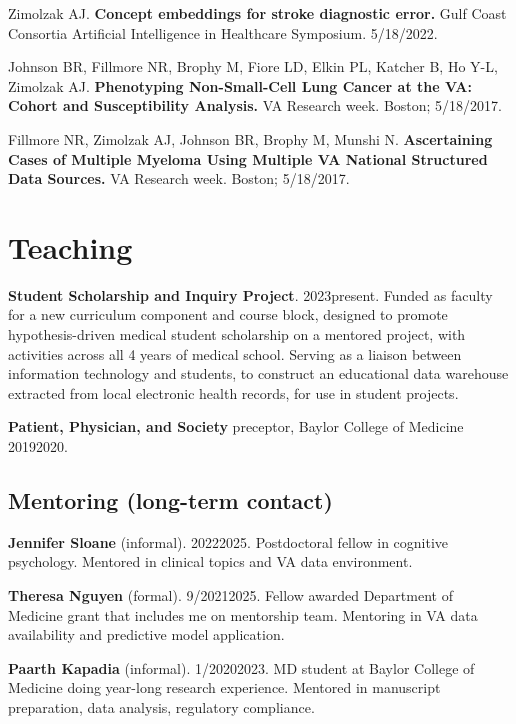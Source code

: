 \documentclass[10pt]{article}
\begin{document}
Zimolzak AJ. \textbf{Concept embeddings for stroke diagnostic error.}
Gulf Coast Consortia Artificial Intelligence in Healthcare Symposium.
5/18/2022.

Johnson BR, Fillmore NR, Brophy M, Fiore LD, Elkin PL, Katcher B, Ho
Y-L, Zimolzak AJ. \textbf{Phenotyping Non-Small-Cell Lung Cancer at
  the VA: Cohort and Susceptibility Analysis.} VA Research week.
Boston; 5/18/2017.

Fillmore NR, Zimolzak AJ, Johnson BR, Brophy M, Munshi N.
\textbf{Ascertaining Cases of Multiple Myeloma Using Multiple VA
  National Structured Data Sources.} VA Research week. Boston;
5/18/2017.



\section{Teaching}

\textbf{Student Scholarship and Inquiry Project}. 2023\ndash{}present.
Funded as faculty for a new curriculum component and course block,
designed to promote hypothesis-driven medical student scholarship on a
mentored project, with activities across all 4 years of medical
school. Serving as a liaison between information technology and
students, to construct an educational data warehouse extracted from
local electronic health records, for use in student projects.

\textbf{Patient, Physician, and Society} preceptor, Baylor College of
Medicine 2019\ndash{}2020.

\subsection{Mentoring (long-term contact)}  %


\textbf{Jennifer Sloane} (informal). 2022\ndash{}2025. Postdoctoral
fellow in cognitive psychology. Mentored in clinical topics and VA
data environment.

\textbf{Theresa Nguyen} (formal). 9/2021\ndash{}2025.
Fellow awarded Department of Medicine grant that includes me on
mentorship team. Mentoring in VA data availability and predictive
model application.

\textbf{Paarth Kapadia} (informal). 1/2020\ndash{}2023. MD student
at Baylor College of Medicine doing year-long research experience.
Mentored in manuscript preparation, data analysis, regulatory
compliance.
\end{document}
